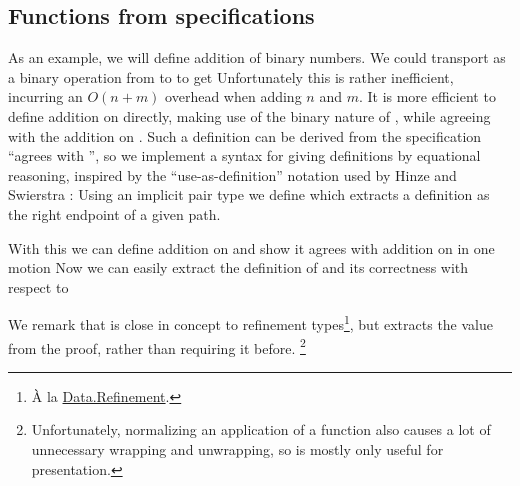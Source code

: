 \subsection{Functions from specifications}\label{ssec:useas}
As an example, we will define addition of binary numbers. We could transport \AgdaFunction{\_+\_} as a binary operation
from \bN to \bL to get
Unfortunately this is rather inefficient, incurring an $O(n + m)$ overhead when adding $n$ and $m$. It is more efficient to define addition on \bL{} directly, making use of the binary nature of \bL{}, while agreeing with the addition on \bN{}. Such a definition can be derived from the specification ``agrees with \AgdaFunction{\_+\_}'', so we implement a syntax for giving definitions by equational reasoning, inspired by the ``use-as-definition'' notation used by Hinze and Swierstra \cite{calcdata}: Using an implicit pair type
we define
which extracts a definition as the right endpoint of a given path.

With this we can define addition on \bL{} and show it agrees with addition on \bN{} in one motion
Now we can easily extract the definition of  and its correctness with respect to \AgdaFunction{\_+\_} 

We remark that  is close in concept to refinement types\footnote{À la \href{https://agda.github.io/agda-stdlib/Data.Refinement.html}{Data.Refinement}.}, but extracts the value from the proof, rather than requiring it before. \footnote{Unfortunately, normalizing an application of a  function also causes a lot of unnecessary wrapping and unwrapping, so  is mostly only useful for presentation.} %


